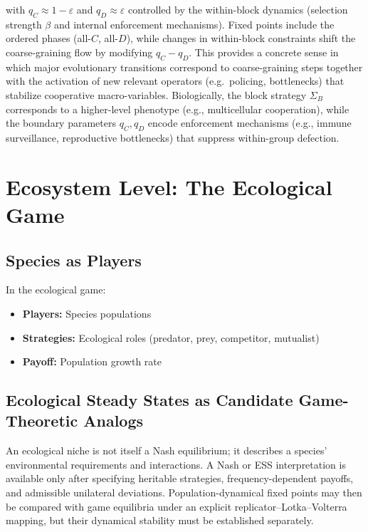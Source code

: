 \documentclass[12pt,a4paper]{article}
\theoremstyle{remark}
\begin{document}
with $q_C\approx 1-\varepsilon$ and $q_D\approx \varepsilon$ controlled by the within-block dynamics (selection strength $\beta$ and internal enforcement mechanisms).
Fixed points include the ordered phases (all-$C$, all-$D$), while changes in within-block constraints shift the coarse-graining flow by modifying $q_C-q_D$.
This provides a concrete sense in which major evolutionary transitions correspond to coarse-graining steps together with the activation of new relevant operators (e.g.\ policing, bottlenecks) that stabilize cooperative macro-variables. Biologically, the block strategy $\Sigma_B$ corresponds to a higher-level phenotype (e.g., multicellular cooperation), while the boundary parameters $q_C, q_D$ encode enforcement mechanisms (e.g., immune surveillance, reproductive bottlenecks) that suppress within-group defection.

\section{Ecosystem Level: The Ecological Game}
\label{sec:ecosystem}

\subsection{Species as Players}

In the ecological game:
\begin{itemize}
    \item \textbf{Players:} Species populations
    \item \textbf{Strategies:} Ecological roles (predator, prey, competitor, mutualist)
    \item \textbf{Payoff:} Population growth rate
\end{itemize}

\subsection{Ecological Steady States as Candidate Game-Theoretic Analogs}

An ecological niche is not itself a Nash equilibrium; it describes a species' environmental requirements and interactions. A Nash or ESS interpretation is available only after specifying heritable strategies, frequency-dependent payoffs, and admissible unilateral deviations. Population-dynamical fixed points may then be compared with game equilibria under an explicit replicator--Lotka--Volterra mapping, but their dynamical stability must be established separately.
\end{document}
